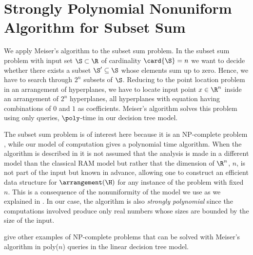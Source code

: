 \section[Strongly Polynomial Nonuniform Algorithm \dots]{Strongly Polynomial Nonuniform Algorithm for Subset Sum}

We apply Meiser's algorithm to the subset sum problem. In the subset sum
problem with input set $\S \subset \R$ of cardinality $\card{\S} = n$ we want to
decide whether there exists a subset $\S' \subseteq \S$ whose elements sum up to zero. Hence, we have
to search through $2^n$ subsets of $\S$. Reducing to the point location problem
in an arrangement of hyperplanes, we have to locate input point $x \in
\R^n$ inside an arrangement of $2^n$ hyperplanes, \ie all hyperplanes with
equation having combinations of $0$ and $1$ as coefficients. Meiser's algorithm
solves this problem using only  queries, \ie $\poly$-time
in our decision tree model.

The subset sum problem is of interest here because it is an NP-complete problem
\cite{karp:1972}, while our model of computation gives a polynomial time
algorithm. When the algorithm is described in \cite{burgisser:1997} it is not
assumed that the analysis is made in a different model than the classical
RAM model but rather that the dimension of $\R^n$, $n$, is not part of the input
but known in advance, allowing one to construct an efficient data structure for
$\arrangement(\H)$ for any instance of the problem with fixed $n$.
This is a consequence of the nonuniformity of the model we use as we explained
in . In our case, the algorithm is
also \emph{strongly polynomial} since the computations involved produce only real
numbers whose sizes are bounded by the size of the input.

\citet*{meiser:1993,burgisser:1997} give other examples of
NP-complete problems that can be solved with Meiser's algorithm in poly(\(n\))
queries in the linear decision tree model.
